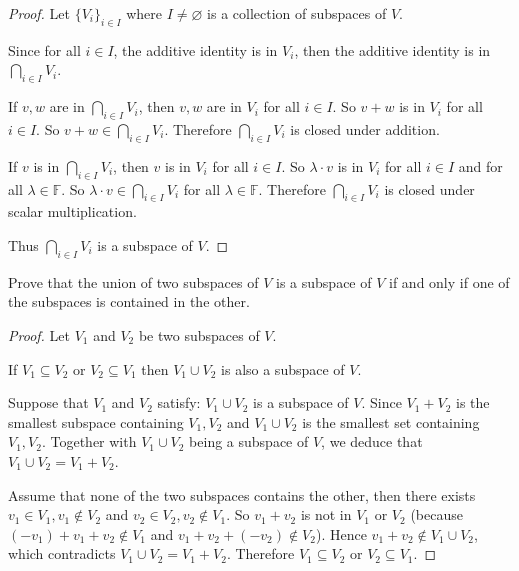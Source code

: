 \begin{proof}
    Let ${\{V_{i}\}}_{i\in I}$ where $I\ne\varnothing$ is a collection of subspaces of $V$.

    Since for all $i\in I$, the additive identity is in $V_{i}$, then the additive identity is in $\bigcap_{i\in I} V_{i}$.

    If $v, w$ are in $\bigcap_{i\in I}V_{i}$, then $v, w$ are in $V_{i}$ for all $i\in I$. So $v + w$ is in $V_{i}$ for all $i\in I$. So $v+w\in \bigcap_{i\in I}V_{i}$. Therefore $\bigcap_{i\in I}V_{i}$ is closed under addition.

    If $v$ is in $\bigcap_{i\in I}V_{i}$, then $v$ is in $V_{i}$ for all $i\in I$. So $\lambda\cdot v$ is in $V_{i}$ for all $i\in I$ and for all $\lambda\in\mathbb{F}$. So $\lambda\cdot v\in \bigcap_{i\in I}V_{i}$ for all $\lambda\in\mathbb{F}$. Therefore $\bigcap_{i\in I}V_{i}$ is closed under scalar multiplication.

    Thus $\bigcap_{i\in I} V_{i}$ is a subspace of $V$.
\end{proof}

\begin{exercise}
    Prove that the union of two subspaces of $V$ is a subspace of $V$ if and only if one of the subspaces is contained in the other.
\end{exercise}

\begin{proof}
    Let $V_{1}$ and $V_{2}$ be two subspaces of $V$.

    If $V_{1}\subseteq V_{2}$ or $V_{2}\subseteq V_{1}$ then $V_{1}\cup V_{2}$ is also a subspace of $V$.

    Suppose that $V_{1}$ and $V_{2}$ satisfy: $V_{1}\cup V_{2}$ is a subspace of $V$. Since $V_{1} + V_{2}$ is the smallest subspace containing $V_{1}, V_{2}$ and $V_{1}\cup V_{2}$ is the smallest set containing $V_{1}, V_{2}$. Together with $V_{1}\cup V_{2}$ being a subspace of $V$, we deduce that $V_{1}\cup V_{2} = V_{1} + V_{2}$.

    Assume that none of the two subspaces contains the other, then there exists $v_{1}\in V_{1}, v_{1}\notin V_{2}$ and $v_{2}\in V_{2}, v_{2}\notin V_{1}$. So $v_{1} + v_{2}$ is not in $V_{1}$ or $V_{2}$ (because $(-v_{1}) + v_{1} + v_{2}\notin V_{1}$ and $v_{1} + v_{2} + (-v_{2})\notin V_{2}$). Hence $v_{1} + v_{2}\notin V_{1}\cup V_{2}$, which contradicts $V_{1}\cup V_{2} = V_{1} + V_{2}$. Therefore $V_{1}\subseteq V_{2}$ or $V_{2}\subseteq V_{1}$.
\end{proof}

